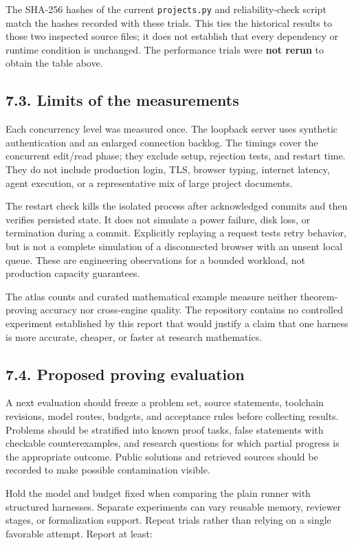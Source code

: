\documentclass[11pt,a4paper]{article}
\begin{document}
The SHA-256 hashes of the current \nolinkurl{projects.py} and reliability-check script match the hashes recorded with these trials. This ties the historical results to those two inspected source files; it does not establish that every dependency or runtime condition is unchanged. The performance trials were \textbf{not rerun} to obtain the table above.

\subsection*{7.3. Limits of the measurements}

Each concurrency level was measured once. The loopback server uses synthetic authentication and an enlarged connection backlog. The timings cover the concurrent edit/read phase; they exclude setup, rejection tests, and restart time. They do not include production login, TLS, browser typing, internet latency, agent execution, or a representative mix of large project documents.

The restart check kills the isolated process after acknowledged commits and then verifies persisted state. It does not simulate a power failure, disk loss, or termination during a commit. Explicitly replaying a request tests retry behavior, but is not a complete simulation of a disconnected browser with an unsent local queue. These are engineering observations for a bounded workload, not production capacity guarantees.

The atlas counts and curated mathematical example measure neither theorem-proving accuracy nor cross-engine quality. The repository contains no controlled experiment established by this report that would justify a claim that one harness is more accurate, cheaper, or faster at research mathematics.

\subsection*{7.4. Proposed proving evaluation}

A next evaluation should freeze a problem set, source statements, toolchain revisions, model routes, budgets, and acceptance rules before collecting results. Problems should be stratified into known proof tasks, false statements with checkable counterexamples, and research questions for which partial progress is the appropriate outcome. Public solutions and retrieved sources should be recorded to make possible contamination visible.

Hold the model and budget fixed when comparing the plain runner with structured harnesses. Separate experiments can vary reusable memory, reviewer stages, or formalization support. Repeat trials rather than relying on a single favorable attempt. Report at least:
\end{document}
